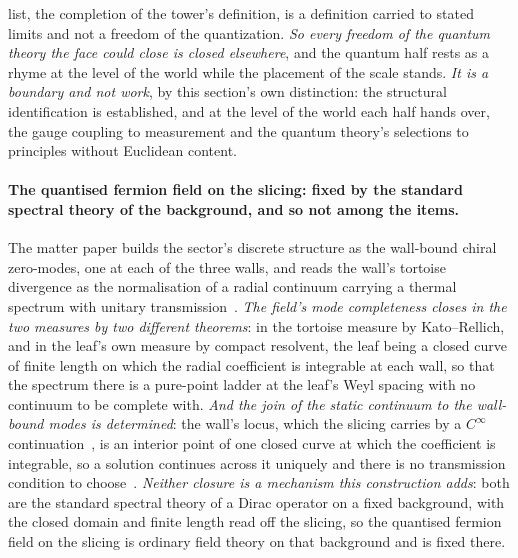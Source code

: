 \documentclass[11pt,a4paper]{article}
\theoremstyle{plain}
\theoremstyle{definition}
\theoremstyle{remark}
\begin{document}
\begin{enumerate}
list, the completion of the tower's definition, is a definition carried to stated limits and not a freedom of the quantization. \emph{So every freedom of the quantum theory the face could close is closed elsewhere}, and the quantum half rests as a rhyme at the level of the world while the placement of the scale stands.  \emph{It is a boundary and not work}, by this section's own distinction: the structural identification is established, and at the level of the world each half hands over, the gauge coupling to measurement and the quantum theory's selections to principles without Euclidean content.
\end{enumerate}

\paragraph{The quantised fermion field on the slicing: fixed by the standard spectral theory of the background, and so not among the items.}\label{frontier:fermion} The matter paper builds the sector's discrete structure as the wall-bound chiral zero-modes, one at each of the three walls, and reads the wall's tortoise divergence as the normalisation of a radial continuum carrying a thermal spectrum with unitary transmission~\cite{JanzenMatter}. \emph{The field's mode completeness closes in the two measures by two different theorems}: in the tortoise measure by Kato--Rellich, and in the leaf's own measure by compact resolvent, the leaf being a closed curve of finite length on which the radial coefficient is integrable at each wall, so that the spectrum there is a pure-point ladder at the leaf's Weyl spacing with no continuum to be complete with. \emph{And the join of the static continuum to the wall-bound modes is determined}: the wall's locus, which the slicing carries by a $C^{\infty}$ continuation~\cite{JanzenSlicing,JanzenCircle}, is an interior point of one closed curve at which the coefficient is integrable, so a solution continues across it uniquely and there is no transmission condition to choose~\cite{JanzenMatter}. \emph{Neither closure is a mechanism this construction adds}: both are the standard spectral theory of a Dirac operator on a fixed background, with the closed domain and finite length read off the slicing, so the quantised fermion field on the slicing is ordinary field theory on that background and is fixed there.
\end{document}
